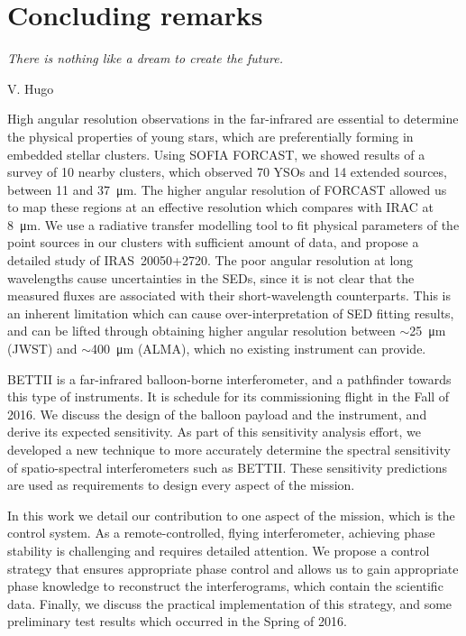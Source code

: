 
\chapter[Concluding remarks]{Concluding remarks} %
\label{chap:conclusion}


\epigraph{\small\itshape There is nothing like a dream to create the future.}{V. Hugo}

High angular resolution observations in the far-infrared are essential to determine the physical properties of young stars, which are preferentially forming in embedded stellar clusters. Using SOFIA FORCAST, we showed results of a survey of 10 nearby clusters, which observed 70 YSOs and 14 extended sources, between 11 and \SI{37}{\um}. The higher angular resolution of FORCAST allowed us to map these regions at an effective resolution which compares with \Spitzer IRAC at \SI{8}{\um}. We use a radiative transfer modelling tool to fit physical parameters of the point sources in our clusters with sufficient amount of data, and propose a detailed study of IRAS~20050+2720. The poor angular resolution at long wavelengths cause uncertainties in the SEDs, since it is not clear that the measured fluxes are associated with their short-wavelength counterparts. This is an inherent limitation which can cause over-interpretation of SED fitting results, and can be lifted through obtaining higher angular resolution between $\sim$\SI{25}{\um} (JWST) and $\sim$\SI{400}{\um} (ALMA), which no existing instrument can provide.


BETTII is a far-infrared balloon-borne interferometer, and a pathfinder towards this type of instruments. It is schedule for its commissioning flight in the Fall of 2016. We discuss the design of the balloon payload and the instrument, and derive its expected sensitivity. As part of this sensitivity analysis effort, we developed a new technique to more accurately determine the spectral sensitivity of spatio-spectral interferometers such as BETTII. These sensitivity predictions are used as requirements to design every aspect of the mission.

In this work we detail our contribution to one aspect of the mission, which is the control system. As a remote-controlled, flying interferometer, achieving phase stability is challenging and requires detailed attention. We propose a control strategy that ensures appropriate phase control and allows us to gain appropriate phase knowledge to reconstruct the interferograms, which contain the scientific data. Finally, we discuss the practical implementation of this strategy, and some preliminary test results which occurred in the Spring of 2016.

